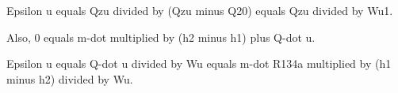Epsilon u equals Qzu divided by (Qzu minus Q20) equals Qzu divided by Wu1.  

Also, 0 equals m-dot multiplied by (h2 minus h1) plus Q-dot u.  

Epsilon u equals Q-dot u divided by Wu equals m-dot R134a multiplied by (h1 minus h2) divided by Wu.